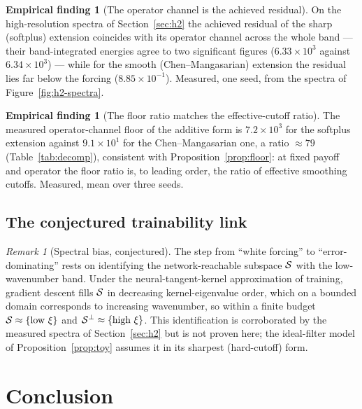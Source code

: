\documentclass[11pt]{article}
\theoremstyle{plain}
\theoremstyle{definition}
\newtheorem{finding}[theorem]{Empirical finding}
\theoremstyle{remark}
\newtheorem{remark}[theorem]{Remark}
\begin{document}
\begin{finding}[The operator channel is the achieved residual]\label{find:residual}
On the high-resolution spectra of Section~\ref{sec:h2} the achieved residual of
the sharp (softplus) extension coincides with its operator channel across the
whole band --- their band-integrated energies agree to two significant figures
($6.33\times10^{3}$ against $6.34\times10^{3}$) --- while for the smooth
(Chen--Mangasarian) extension the residual lies far below the forcing
($8.85\times10^{-1}$). Measured, one seed, from the spectra of
Figure~\ref{fig:h2-spectra}.
\end{finding}

\begin{finding}[The floor ratio matches the effective-cutoff ratio]\label{find:floor}
The measured operator-channel floor of the additive form is $7.2\times10^{3}$ for
the softplus extension against $9.1\times10^{1}$ for the Chen--Mangasarian one, a
ratio $\approx79$ (Table~\ref{tab:decomp}), consistent with
Proposition~\ref{prop:floor}: at fixed payoff and operator the floor ratio is, to
leading order, the ratio of effective smoothing cutoffs. Measured, mean over three
seeds.
\end{finding}

\subsection{The conjectured trainability link}\label{sec:mech-ntk}

\begin{remark}[Spectral bias, conjectured]\label{rem:ntk}
The step from ``white forcing'' to ``error-dominating'' rests on identifying the
network-reachable subspace $\mathcal{S}$ with the low-wavenumber band. Under the
neural-tangent-kernel approximation of training, gradient descent fills
$\mathcal{S}$ in decreasing kernel-eigenvalue order, which on a bounded domain
corresponds to increasing wavenumber, so within a finite budget
$\mathcal{S}\approx\{\text{low }\xi\}$ and
$\mathcal{S}^{\perp}\approx\{\text{high }\xi\}$. This identification is
corroborated by the measured spectra of Section~\ref{sec:h2} but is not proven
here; the ideal-filter model of Proposition~\ref{prop:toy} assumes it in its
sharpest (hard-cutoff) form.
\end{remark}

\section{Conclusion}\label{sec:conclusion}
\end{document}
